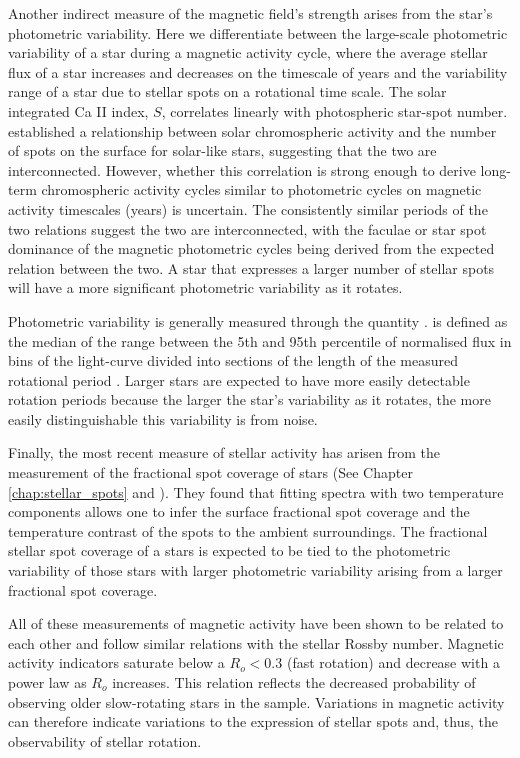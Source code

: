 Another indirect measure of the magnetic field's strength arises from the star's photometric variability.
Here we differentiate between the large-scale photometric variability of a star during a magnetic activity cycle, where the average stellar flux of a star increases and decreases on the timescale of years and the variability range of a star due to stellar spots on a rotational time scale.
The solar integrated Ca II index, $S$, correlates linearly with photospheric star-spot number.
 \citet{lorenzo_fine_2016, lorenzo_solar_2018} established a relationship between solar chromospheric activity and the number of spots on the surface for solar-like stars, suggesting that the two are interconnected. 
However, whether this correlation is strong enough to derive long-term chromospheric activity cycles similar to photometric cycles on magnetic activity timescales (years) is uncertain.
The consistently similar periods of the two relations suggest the two are interconnected, with the faculae or star spot dominance of the magnetic photometric cycles being derived from the expected relation between the two.
A star that expresses a larger number of stellar spots will have a more significant photometric variability as it rotates.

Photometric variability is generally measured through the quantity \rper{}.
\rper{} is defined as the median of the range between the 5th and 95th percentile of normalised flux in bins of the light-curve divided into sections of the length of the measured rotational period \citep{mcquillan_rotation_2014}.
Larger \rper{} stars are expected to have more easily detectable rotation periods because the larger the star's variability as it rotates, the more easily distinguishable this variability is from noise.

Finally, the most recent measure of stellar activity has arisen from the measurement of the fractional spot coverage of stars (See Chapter \ref{chap:stellar_spots} and \citet{cao_starspots_2022}).
They found that fitting \apogee spectra with two temperature components allows one to infer the surface fractional spot coverage and the temperature contrast of the spots to the ambient surroundings.
The fractional stellar spot coverage of a stars is expected to be tied to the photometric variability of those stars with larger photometric variability arising from a larger fractional spot coverage.

All of these measurements of magnetic activity have been shown to be related to each other and follow similar relations with the stellar Rossby number.
Magnetic activity indicators saturate below a $R_o<0.3$ \citep{cao_starspots_2022} (fast rotation) and decrease with a power law as $R_o$ increases.
This relation reflects the decreased probability of observing older slow-rotating stars in the \citet{mcquillan_rotation_2014} sample.
Variations in magnetic activity can therefore indicate variations to the expression of stellar spots and, thus, the observability of stellar rotation.

